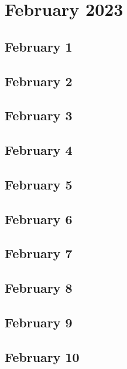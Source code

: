 %
%
%

\chapter{February 2023}
\label{intro} %

\section{February 1}

\section{February 2}

\section{February 3}

\section{February 4}

\section{February 5}

\section{February 6}

\section{February 7}

\section{February 8}

\section{February 9}

\section{February 10}

